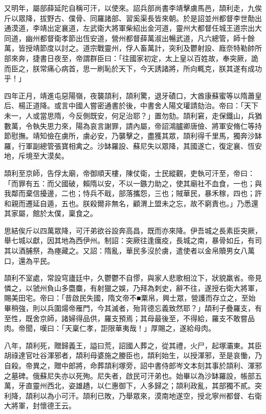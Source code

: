 \begin{pinyinscope}
 又明年，屬部薛延陀自稱可汗，以使來。詔兵部尚書李靖擊虜馬邑，頡利走，九俟斤以眾降，拔野古、僕骨、同羅諸部、習奚渠長皆來朝。於是詔並州都督李世勣出通漠道，李靖出定襄道，左武衛大將軍柴紹出金河道，靈州大都督任城王道宗出大同道，幽州都督衛孝節出恆安道，營州都督薛萬淑出暢武道，凡六總管，師十餘萬，皆授靖節度以討之。道宗戰靈州，俘人畜萬計，突利及鬱射設、廕奈特勒帥所部來奔，捷書日夜至，帝謂群臣曰：「往國家初定，太上皇以百姓故，奉突厥，詭而臣之，朕常痛心病首，思一刷恥於天下，今天誘諸將，所向輒克，朕其遂有成功乎！」



 四年正月，靖進屯惡陽嶺，夜襲頡利，頡利驚，退牙磧口，大酋康蘇蜜等以隋蕭皇后、楊正道降。或言中國人嘗密通書於後，中書舍人陽文瓘請劾治。帝曰：「天下未一，人或當思隋，今反側既安，何足治耶？」置勿劾。頡利窘，走保鐵山，兵猶數萬，令執失思力來，陽為哀言謝罪，請內屬，帝詔鴻臚卿唐儉、將軍安脩仁等持節慰撫。靖知儉在虜所，虜必安，乃襲擊之，盡獲其眾，頡利得千里馬，獨奔沙缽羅，行軍副總管張寶相禽之。沙缽羅設、蘇尼失以眾降，其國遂亡，復定襄、恆安地，斥境至大漠矣。



 頡利至京師，告俘太廟，帝御順天樓，陳仗衛，士民縱觀，吏執可汗至，帝曰：「而罪有五：而父國破，賴隋以安，不以一鏃力助之，使其廟社不血食，一也；與我鄰而棄信擾邊，二也；恃兵不戢，部落攜怨，三也；賊華民，暴禾稼，四也；許和親而遷延自遁，五也。朕殺爾非無名，顧渭上盟未之忘，故不窮責也。」乃悉還其家屬，館於太僕，稟食之。



 思結俟斤以四萬眾降，可汗弟欲谷設奔高昌，既而亦來降。伊吾城之長素臣突厥，舉七城以獻，因其地為西伊州。制詔：突厥往逢癘疫，長城之南，暴骨如丘，有司其以酒脯祭，為瘞藏之。又詔：隋亂，華民多沒於虜，遣使者以金帛贖男女八萬口，還為平民。



 頡利不室處，常設穹廬廷中，久鬱鬱不自憀，與家人悲歌相泣下，狀貌羸省。帝見憐之，以虢州負山多麕麋，有射獵之娛，乃拜為刺史，辭不往，遂授右衛大將軍，賜美田宅。帝曰：「昔啟民失國，隋文帝不■粟帛，興士眾，營護而存立之，至始畢稍強，則以兵圍煬帝雁門，今其滅者，殆背德忘義致然耶？」頡利子疊羅支，有至性，既舍京師，諸婦得品供，羅支預焉；其母最後至，不得給，羅支不敢嘗品肉。帝聞，嘆曰：「天稟仁孝，詎限華夷哉！」厚賜之，遂給母肉。



 八年，頡利死，贈歸義王，謚曰荒，詔國人葬之，從其禮，火尸，起塚灞東。其臣胡祿達官吐谷渾邪者，頡利母婆施之媵臣也，頡利始生，以授渾邪，至是哀慟，乃自殺。帝異之，贈中郎將，命葬頡利塚旁，詔中書侍郎岑文本刻其事於頡利、渾邪之墓碑。俄蘇尼失亦以死殉。尼失者，啟民可汗弟也。始畢以為沙缽羅設，帳部五萬，牙直靈州西北，姿雄趫，以仁惠御下，人多歸之；頡利政亂，其部獨不貳。突利降，頡利以為小可汗。頡利已敗，乃舉眾來，漠南地遂空，授北寧州都督、右衛大將軍，封懷德王云。




\end{pinyinscope}

